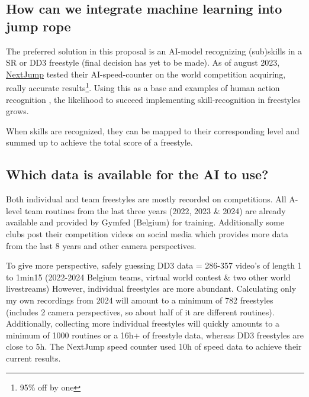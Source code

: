 \subsection{How can we integrate machine learning into jump rope}

The preferred solution in this proposal is an AI-model recognizing (sub)skills in a SR or DD3 freestyle (final decision has yet to be made). As of august 2023, \href{https://nextjump.app/}{NextJump} tested their AI-speed-counter on the world competition acquiring, really accurate results\footnote{95\% off by one}.
Using this as a base and examples of human action recognition \autocite{Yin_2024}, the likelihood to succeed implementing skill-recognition in freestyles grows.

When skills are recognized, they can be mapped to their corresponding level and summed up to achieve the total score of a freestyle.

\subsection{Which data is available for the AI to use?}

Both individual and team freestyles are mostly recorded on competitions. All A-level team routines from the last three years (2022, 2023 \& 2024) are already available and provided by Gymfed (Belgium) for training. Additionally some clubs post their competition videos on social media which provides more data from the last 8 years and other camera perspectives.

To give more perspective, safely guessing DD3 data = 286-357 video's of length 1 to 1min15 (2022-2024 Belgium teams, virtual world contest \& two other world livestreams)
However, individual freestyles are more abundant. Calculating only my own recordings from 2024 will amount to a minimum of 782 freestyles (includes 2 camera perspectives, so about half of it are different routines). Additionally, collecting more individual freestyles will quickly amounts to a minimum of 1000 routines or a 16h+ of freestyle data, whereas DD3 freestyles are close to 5h. The NextJump speed counter used 10h of speed data to achieve their current results.


    
